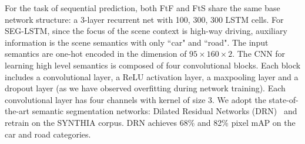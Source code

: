 \documentclass[10pt,twocolumn,letterpaper]{article}
\begin{document}
For the task of sequential prediction, both FtF and FtS share the same base network structure:
a 3-layer recurrent net with 100, 300, 300 LSTM cells.
For SEG-LSTM, since the focus of the scene context is high-way driving, auxiliary information is the scene semantics with only ``car" and ``road". The input semantics are one-hot encoded in the dimension of $95\times160\times2$. The CNN for learning high level semantics is composed of four convolutional blocks. Each block includes a convolutional layer, a ReLU activation layer, a maxpooling layer and a dropout layer (as we have observed overfitting during network training). Each convolutional layer has four channels with kernel of size 3.
We adopt the state-of-the-art semantic segmentation networks: Dilated Residual Networks (DRN)~\cite{yu2017dilated} and retrain on the SYNTHIA corpus. DRN achieves 68\% and 82\% pixel mAP on the car and road categories.
\end{document}
